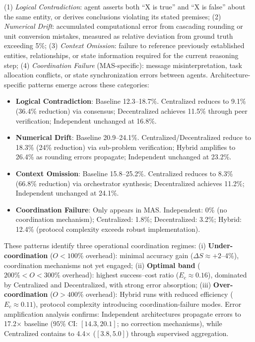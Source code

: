 (1) \textit{Logical Contradiction}: agent asserts both ``X is true'' and ``X is false'' about the same entity, or derives conclusions violating its stated premises;
(2) \textit{Numerical Drift}: accumulated computational error from cascading rounding or unit conversion mistakes, measured as relative deviation from ground truth exceeding 5\%;
(3) \textit{Context Omission}: failure to reference previously established entities, relationships, or state information required for the current reasoning step;
(4) \textit{Coordination Failure} (MAS-specific): message misinterpretation, task allocation conflicts, or state synchronization errors between agents. Architecture-specific patterns emerge across these categories:
\begin{itemize}[leftmargin=1.2em]
    \item \textbf{Logical Contradiction}: Baseline 12.3--18.7\%. Centralized reduces to 9.1\% (36.4\% reduction) via consensus; Decentralized achieves 11.5\% through peer verification; Independent unchanged at 16.8\%.
    
    \item \textbf{Numerical Drift}: Baseline 20.9--24.1\%. Centralized/Decentralized reduce to 18.3\% (24\% reduction) via sub-problem verification; Hybrid amplifies to 26.4\% as rounding errors propagate; Independent unchanged at 23.2\%.
    
    \item \textbf{Context Omission}: Baseline 15.8--25.2\%. Centralized reduces to 8.3\% (66.8\% reduction) via orchestrator synthesis; Decentralized achieves 11.2\%; Independent unchanged at 24.1\%.
    
    \item \textbf{Coordination Failure}: Only appears in MAS. Independent: 0\% (no coordination mechanism); Centralized: 1.8\%; Decentralized: 3.2\%; Hybrid: 12.4\% (protocol complexity exceeds robust implementation).
\end{itemize}
  
  These patterns identify three operational coordination regimes: (i) \textbf{Under-coordination} ($O < 100\%$ overhead): minimal accuracy gain ($\Delta S \approx +2$--4\%), coordination mechanisms not yet engaged; (ii) \textbf{Optimal band} ($200\% < O < 300\%$ overhead): highest success--cost ratio ($E_c \approx 0.16$), dominated by Centralized and Decentralized, with strong error absorption; (iii) \textbf{Over-coordination} ($O > 400\%$ overhead): Hybrid runs with reduced efficiency ($E_c \approx 0.11$), protocol complexity introducing coordination-failure modes. Error amplification analysis confirms: Independent architectures propagate errors to 17.2$\times$ baseline ($95\%$ CI: $[14.3, 20.1]$; no correction mechanisms), while Centralized contains to 4.4$\times$ ($[3.8, 5.0]$) through supervised aggregation.
  
